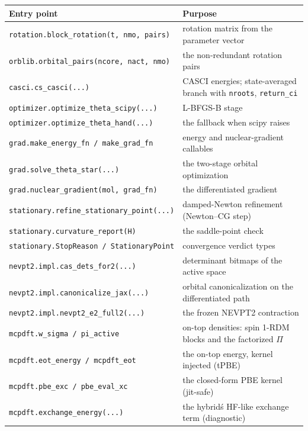 \begin{center}
\begin{tabularx}{\textwidth}{lX}
\toprule
Entry point & Purpose \\
\midrule
\texttt{rotation.block\_rotation(t, nmo, pairs)} & rotation matrix from the parameter vector \\
\texttt{orblib.orbital\_pairs(ncore, nact, nmo)} & the non-redundant rotation pairs \\
\texttt{casci.cs\_casci(...)} & CASCI energies; state-averaged branch with
  \texttt{nroots}, \texttt{return\_ci} \\
\texttt{optimizer.optimize\_theta\_scipy(...)} & L-BFGS-B stage \\
\texttt{optimizer.optimize\_theta\_hand(...)} & the fallback when scipy raises \\
\texttt{grad.make\_energy\_fn / make\_grad\_fn} & energy and nuclear-gradient callables \\
\texttt{grad.solve\_theta\_star(...)} & the two-stage orbital optimization \\
\texttt{grad.nuclear\_gradient(mol, grad\_fn)} & the differentiated gradient \\
\texttt{stationary.refine\_stationary\_point(...)} & damped-Newton refinement (Newton--CG step) \\
\texttt{stationary.curvature\_report(H)} & the saddle-point check \\
\texttt{stationary.StopReason / StationaryPoint} & convergence verdict types \\
\texttt{nevpt2.impl.cas\_dets\_for2(...)} & determinant bitmaps of the active space \\
\texttt{nevpt2.impl.canonicalize\_jax(...)} & orbital canonicalization on the differentiated path \\
\texttt{nevpt2.impl.nevpt2\_e2\_full2(...)} & the frozen NEVPT2 contraction \\
\texttt{mcpdft.w\_sigma / pi\_active} & on-top densities: spin 1-RDM blocks and the factorized $\Pi$\\
\texttt{mcpdft.eot\_energy / mcpdft\_eot} & the on-top energy, kernel injected (tPBE)\\
\texttt{mcpdft.pbe\_exc / pbe\_eval\_xc} & the closed-form PBE kernel (jit-safe)\\
\texttt{mcpdft.exchange\_energy(...)} & the hybrid\'s HF-like exchange term (diagnostic)\\
\bottomrule
\end{tabularx}
\end{center}

